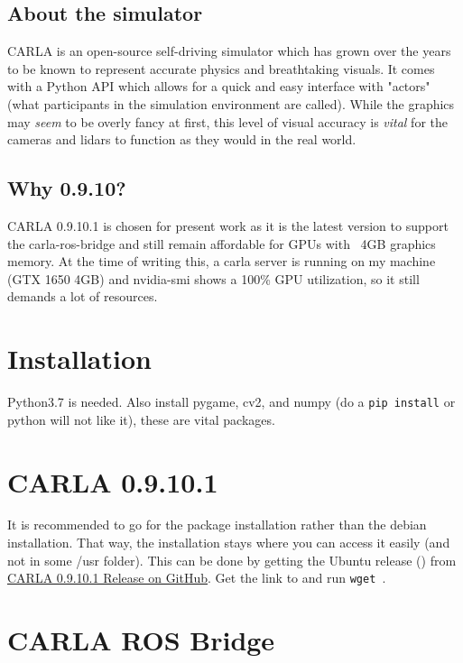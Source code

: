 \documentclass[a4paper,12pt]{report}
\newcommand{\code}[1]{\colorbox{light-gray}{\texttt{#1}}}
\begin{document}
\subsection{About the simulator}
CARLA is an open-source self-driving simulator which has grown over the years to be known to represent accurate physics and breathtaking visuals. It comes with a Python API which allows for a quick and easy interface with "actors" (what participants in the simulation environment are called). While the graphics may \textit{seem} to be overly fancy at first, this level of visual accuracy is \textit{vital} for the cameras and lidars to function as they would in the real world.
\subsection{Why 0.9.10?}
CARLA 0.9.10.1 is chosen for present work as it is the latest version to support the carla-ros-bridge and still remain affordable for GPUs with ~4GB graphics memory. At the time of writing this, a carla server is running on my machine (GTX 1650 4GB) and nvidia-smi shows a 100\% GPU utilization, so it still demands a lot of resources.

\section{Installation}
Python3.7 is needed. Also install pygame, cv2, and numpy (do a \code{pip install} or python will not like it), these are vital packages.


\section{CARLA 0.9.10.1}
It is recommended to go for the package installation rather than the debian installation. That way, the installation stays where you can access it easily (and not in some /usr folder). This can be done by getting the Ubuntu release () from \href{https://github.com/carla-simulator/carla/releases/tag/0.9.10.1}{CARLA 0.9.10.1 Release on GitHub}. Get the link to  and run \code{wget }.

\section{CARLA ROS Bridge}
\end{document}
